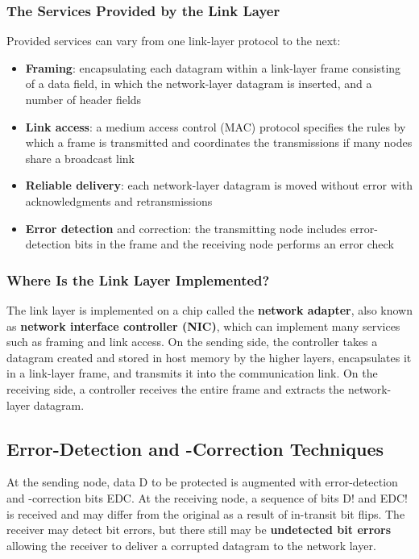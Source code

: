 \documentclass{article}
\begin{document}
\subsubsection{The Services Provided by the Link Layer}
Provided services can vary from one link-layer protocol to the next:
\begin{itemize}
    \item \textbf{Framing}: encapsulating each datagram within a link-layer frame consisting of a data field, in which the network-layer datagram is inserted, and a number of header fields
    \item \textbf{Link access}: a medium access control (MAC) protocol specifies the rules by which a frame is transmitted and coordinates the transmissions if many nodes share a broadcast link
    \item \textbf{Reliable delivery}: each network-layer datagram is moved without error with acknowledgments and retransmissions
    \item \textbf{Error detection} and correction: the transmitting node includes error-detection bits in the frame and the receiving node performs an error check
\end{itemize}
\subsubsection{Where Is the Link Layer Implemented?}
The link layer is implemented on a chip called the \textbf{network adapter}, also known as \textbf{network interface controller (NIC)}, which can implement many services such as framing and link access.
On the sending side, the controller takes a datagram created and stored in host memory by the higher layers, encapsulates it in a link-layer frame, and transmits it into the communication link.
On the receiving side, a controller receives the entire frame and extracts the network-layer datagram.

\subsection{Error-Detection and -Correction Techniques}
At the sending node, data D to be protected is augmented with error-detection and -correction bits EDC.
At the receiving node, a sequence of bits D! and EDC! is received and may differ from the original as a result of in-transit bit flips.
The receiver may detect bit errors, but there still may be \textbf{undetected bit errors} allowing the receiver to deliver a corrupted datagram to the network layer.
\end{document}
